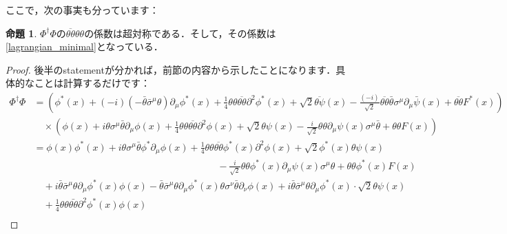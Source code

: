 \documentclass[a4paper,uplatex,dvipdfmx]{jsarticle}
\theoremstyle{definition}
\newtheorem{prop}{命題}
\begin{document}
ここで，次の事実も分っています：

\begin{prop}
  $\Phi^{\dag}\Phi$の$\overline{\theta\theta}\theta\theta$の係数は超対称である．そして，その係数は\eqref{lagrangian_minimal}となっている．
\end{prop}

\begin{proof}
  後半のstatementが分かれば，前節の内容から示したことになります．具体的なことは計算するだけです：
  \begin{align}
    \Phi^{\dag}\Phi
    &=
    \left(
      \phi^{*}(x)
      +
      (-i)(-\bar{\theta}\bar{\sigma}^{\mu}\theta)\partial_{\mu}\phi^{*}(x)
      +
      \frac{1}{4}\theta\theta\overline{\theta\theta}\partial^{2}\phi^{*}(x)      
      +
      \sqrt{2}\overline{\theta\psi}(x)
      -
      \frac{(-i)}{\sqrt{2}}\overline{\theta\theta}\bar{\theta}\sigma^{\mu}\partial_{\mu}\bar{\psi}(x)
      +
      \overline{\theta\theta}
      F^{*}(x)
    \right)
    \nonumber
    \\
    &\quad
    \times
    \left(
      \phi(x)
      +
      i\theta\sigma^{\mu}\bar{\theta}\partial_{\mu}\phi(x)
      +
      \frac{1}{4}\theta\theta\overline{\theta\theta}\partial^{2}\phi(x)
      +
      \sqrt{2}\theta\psi(x)
      -
      \frac{i}{\sqrt{2}}\theta\theta\partial_{\mu}\psi(x)\sigma^{\mu}\bar{\theta}
      +
      \theta\theta
      F(x)
    \right)
    \nonumber
    \\
    &=
    \phi(x)\phi^{*}(x)
    +
    i\theta\sigma^{\mu}\bar{\theta}\phi^{*}\partial_{\mu}\phi(x)
    +
    \frac{1}{4}\theta\theta\overline{\theta\theta}\phi^{*}(x)\partial^{2}\phi(x)
    +
    \sqrt{2}\phi^{*}(x)\theta\psi(x)
    \nonumber
    \\
    &\hspace{8cm}
    -
    \frac{i}{\sqrt{2}}\theta\theta\phi^{*}(x)\partial_{\mu}\psi(x)\sigma^{\mu}\theta
    +
    \theta\theta \phi^{*}(x)F(x)
    \nonumber
    \\
    &\quad
    +
    i\bar{\theta}\bar{\sigma}^{\mu}\theta\partial_{\mu}\phi^{*}(x)
    \phi(x)
    -
    \bar{\theta}\bar{\sigma}^{\mu}\theta\partial_{\mu}\phi^{*}(x)
    \theta\sigma^{\nu}\bar{\theta}\partial_{\nu}\phi(x)
    +
    i\bar{\theta}\bar{\sigma}^{\mu}\theta\partial_{\mu}\phi^{*}(x)
    \cdot
    \sqrt{2}\theta\psi(x)
    \nonumber
    \\
    &\quad
    +
    \frac{1}{4}\theta\theta\bar{\theta\theta}\partial^2\phi^{*}(x)\phi(x)
    \nonumber
    \\
    &\quad

\end{align}
\end{proof}
\end{document}
